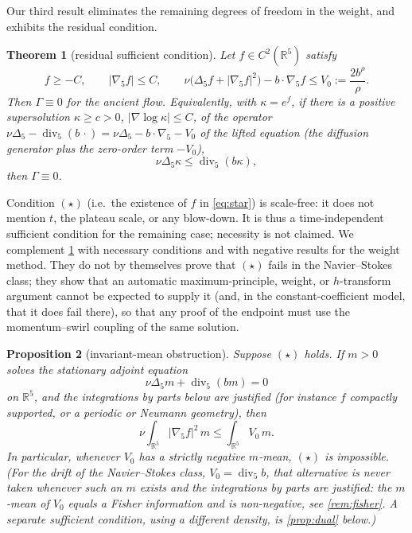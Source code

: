 \documentclass[11pt]{article}
\newtheorem{theorem}{Theorem}[section]
\newtheorem{proposition}[theorem]{Proposition}
\theoremstyle{definition}
\newcommand{\R}{\mathbb{R}}
\newcommand{\Div}{\operatorname{div}}
\begin{document}
Our third result eliminates the remaining degrees of freedom in the weight,
and exhibits the residual condition.

\begin{theorem}[residual sufficient condition]\label{thm:star}
Let $f\in C^2(\R^5)$ satisfy
\begin{equation}\label{eq:star}
f\ge-C,\qquad |\nabla_5f|\le C,\qquad
\nu\bigl(\Delta_5f+|\nabla_5f|^2\bigr)-b\cdot\nabla_5f\le V_0:=\frac{2b^\rho}{\rho}.
\end{equation}
Then $\Gamma\equiv0$ for the ancient flow. Equivalently, with
$\kappa=e^f$, if there is a positive supersolution $\kappa\ge c>0$,
$|\nabla\log\kappa|\le C$, of the operator
$\nu\Delta_5-\Div_5(b\,\cdot)=\nu\Delta_5-b\cdot\nabla_5-V_0$ of the lifted
equation (the diffusion generator plus the zero-order term $-V_0$),
\begin{equation}\label{eq:kappa}
\nu\Delta_5\kappa\le\Div_5(b\kappa),
\end{equation}
then $\Gamma\equiv0$.
\end{theorem}

Condition $(\star)$ (i.e.\ the existence of $f$ in \eqref{eq:star}) is
scale-free: it does not mention $t$, the plateau scale, or any blow-down.
It is thus a time-independent sufficient condition for the remaining case;
necessity is not claimed.
We complement \cref{thm:star} with necessary conditions and with negative
results for the weight method. They do not by themselves prove that $(\star)$
fails in the Navier--Stokes class; they show that an automatic
maximum-principle, weight, or $h$-transform argument cannot be expected to
supply it (and, in the constant-coefficient model, that it does fail there),
so that any proof of the endpoint must use the momentum--swirl coupling of the
same solution.

\begin{proposition}[invariant-mean obstruction]\label{prop:NC}
Suppose $(\star)$ holds. If $m>0$ solves the stationary adjoint equation
\begin{equation}\label{eq:adjoint}
\nu\Delta_5m+\Div_5(bm)=0
\end{equation}
on $\R^5$, and the integrations by parts below are justified (for instance
$f$ compactly supported, or a periodic or Neumann geometry), then
\begin{equation}\label{eq:NCm}
\nu\int_{\R^5}|\nabla_5f|^2\,m\le\int_{\R^5}V_0\,m .
\end{equation}
In particular, whenever $V_0$ has a strictly negative $m$-mean, $(\star)$ is
impossible. (For the drift of the Navier--Stokes class, $V_0=\Div_5b$, that
alternative is never taken \emph{whenever such an $m$ exists and the
integrations by parts are justified}: the $m$-mean of $V_0$ equals a Fisher
information and is non-negative, see \cref{rem:fisher}. A separate sufficient
condition, using a different density, is \cref{prop:dual} below.)
\end{proposition}
\end{document}
